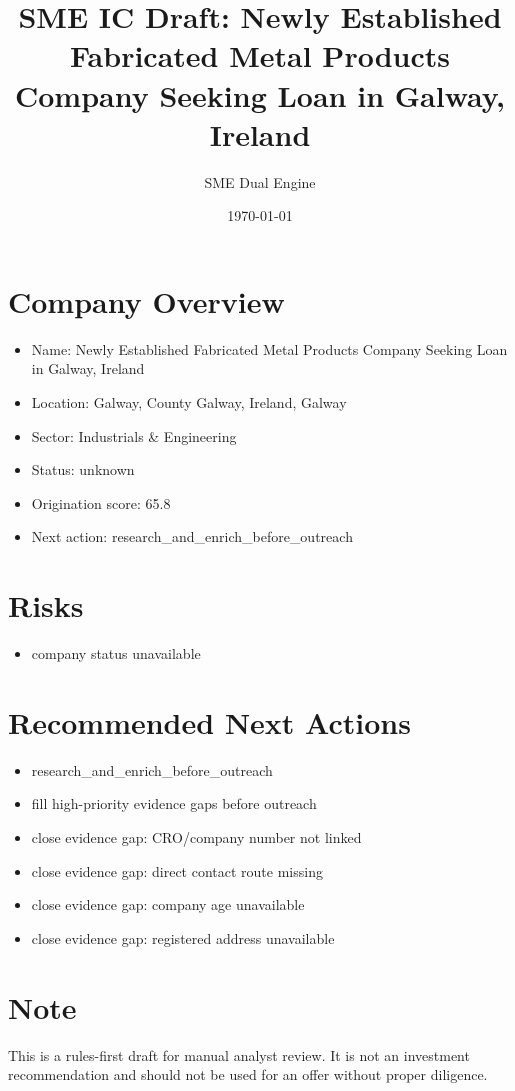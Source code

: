 \documentclass[11pt,a4paper]{article}
\title{SME IC Draft: Newly Established Fabricated Metal Products Company Seeking Loan in Galway, Ireland}
\author{SME Dual Engine}
\date{\today}
\begin{document}
\maketitle
\section*{Company Overview}
\begin{itemize}[leftmargin=1.4em]
\item Name: Newly Established Fabricated Metal Products Company Seeking Loan in Galway, Ireland
\item Location: Galway, County Galway, Ireland, Galway
\item Sector: Industrials \& Engineering
\item Status: unknown
\item Origination score: 65.8
\item Next action: research\_and\_enrich\_before\_outreach
\end{itemize}
\section*{Risks}
\begin{itemize}[leftmargin=1.4em]
\item company status unavailable
\end{itemize}
\section*{Recommended Next Actions}
\begin{itemize}[leftmargin=1.4em]
\item research\_and\_enrich\_before\_outreach
\item fill high-priority evidence gaps before outreach
\item close evidence gap: CRO/company number not linked
\item close evidence gap: direct contact route missing
\item close evidence gap: company age unavailable
\item close evidence gap: registered address unavailable
\end{itemize}
\section*{Note}
This is a rules-first draft for manual analyst review. It is not an investment
recommendation and should not be used for an offer without proper diligence.
\end{document}

